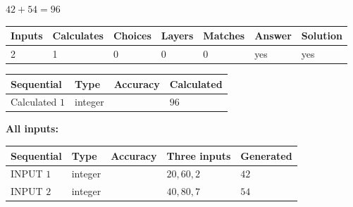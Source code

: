 \documentclass[12pt]{article}
\begin{document}
 
\noindent{}
 
 

$ %
42 +  %
54=   %
96$
 
 
\noindent{}
 
 

 
   
   
   
   
\noindent\begin{tabular}{|l|l|l|l|l|l|l|}
 \hline
Inputs & Calculates & Choices & Layers & Matches & Answer & Solution \\ \hline
 2  & 
 1  & 
 0
  & 
 0  & 
 0  & 
  yes & 
  yes 
  \\ \hline
 \end{tabular}
   
   
   
   
\noindent{}
   
   
  
  
\noindent\begin{tabular}{|l|l|l|l|}
\hline
 Sequential & Type & Accuracy & Calculated \\ 
\hline
 
 
  Calculated $  1 $ & integer &  & 
  $ 96 $ 
 \\  \hline  
 \end{tabular}
   
   
   
   
\noindent\vspace{0.1in}\hspace{-0.08in} {\textbf{\Large{All inputs: }}}
   
   
  
  
\noindent\begin{tabular}{|l|l|l|l|l|}
\hline
 Sequential & Type & Accuracy & Three inputs & Generated \\ 
\hline
 
 
  INPUT $  1 $ & integer &  & $
 20
 , 
 60
 , 
 2
 $ & $ 42 $ 
 \\  \hline  
 
 
  INPUT $  2 $ & integer &  & $
 40
 , 
 80
 , 
 7
 $ & $ 54 $ 
 \\  \hline  
 \end{tabular}
   
   
  
\end{document}
